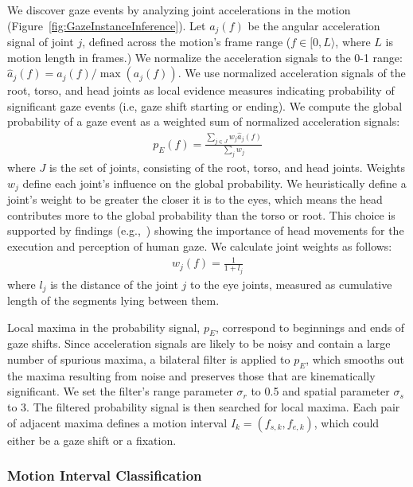 We discover gaze events by analyzing joint accelerations in the motion (Figure~\ref{fig:GazeInstanceInference}). Let $a_j(f)$ be the angular acceleration signal of joint $j$, defined across the motion's frame range ($f \in [0, L\rangle$, where $L$ is motion length in frames.) We normalize the acceleration signals to the 0-1 range: $\hat{a}_j(f) = a_j(f) / \mathop{max}(a_j(f))$. We use normalized acceleration signals of the root, torso, and head joints as local evidence measures indicating probability of significant gaze events (i.e, gaze shift starting or ending). We compute the global probability of a gaze event as a weighted sum of normalized acceleration signals:
%
\begin{align} \label{eq:GazeEventProbability}
p_E(f) = \frac{\sum_{j \in J} w_j \hat{a}_j(f)}{\sum_j w_j}
\end{align}
%
where $J$ is the set of joints, consisting of the root, torso, and head joints. Weights $w_j$ define each joint's influence on the global probability. We heuristically define a joint's weight to be greater the closer it is to the eyes, which means the head contributes more to the global probability than the torso or root. This choice is supported by findings (e.g.,~\citep{hietanen1999does}) showing the importance of head movements for the execution and perception of human gaze. We calculate joint weights as follows:
%
\begin{align} \label{eq:GazeJointWeight}
w_j(f) = \frac{1}{1 + l_j}
\end{align}
%
where $l_j$ is the distance of the joint $j$ to the eye joints, measured as cumulative length of the segments lying between them.

Local maxima in the probability signal, $p_E$, correspond to beginnings and ends of gaze shifts. Since acceleration signals are likely to be noisy and contain a large number of spurious maxima, a bilateral filter is applied to $p_E$, which smooths out the maxima resulting from noise and preserves those that are kinematically significant. We set the filter's range parameter $\sigma_r$ to 0.5 and spatial parameter $\sigma_s$ to 3. The filtered probability signal is then searched for local maxima. Each pair of adjacent maxima defines a motion interval $I_k = (f_{s,k}, f_{e,k})$, which could either be a gaze shift or a fixation.

\subsubsection{Motion Interval Classification}

